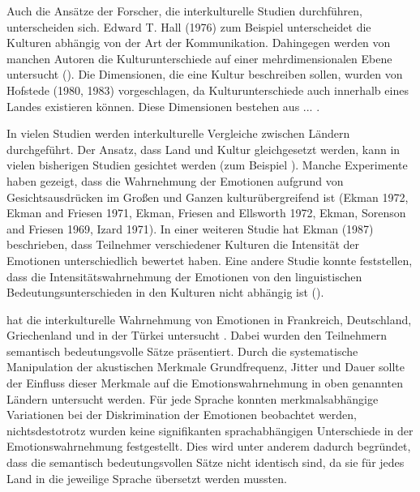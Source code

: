 \documentclass[11pt,a4paper,headsepline,twoside,toc=bibliography]{scrreprt}
\begin{document}
Auch die Ansätze der Forscher, die interkulturelle Studien durchführen, unterscheiden sich. Edward T. Hall (1976) zum Beispiel unterscheidet die Kulturen abhängig von der Art der Kommunikation. Dahingegen werden von manchen Autoren die Kulturunterschiede auf einer mehrdimensionalen Ebene untersucht (\cite{Matsumoto}). Die Dimensionen, die eine Kultur beschreiben sollen, wurden von Hofstede (1980, 1983) vorgeschlagen, da Kulturunterschiede auch innerhalb eines Landes existieren können. Diese Dimensionen bestehen aus ... . 


In vielen Studien werden interkulturelle Vergleiche zwischen Ländern durchgeführt. Der Ansatz, dass Land und Kultur gleichgesetzt werden, kann in vielen bisherigen Studien gesichtet werden (zum Beispiel \cite{ekman1973cross}). Manche Experimente haben gezeigt, dass die Wahrnehmung der Emotionen aufgrund von Gesichtsausdrücken im Großen und Ganzen kulturübergreifend ist (Ekman 1972, Ekman and Friesen 1971, Ekman, Friesen and Ellsworth 1972, Ekman, Sorenson and Friesen 1969, Izard 1971). In einer weiteren Studie hat Ekman (1987) beschrieben, dass Teilnehmer verschiedener Kulturen die Intensität der Emotionen unterschiedlich bewertet haben. Eine andere Studie konnte feststellen, dass die Intensitätswahrnehmung der Emotionen von den linguistischen Bedeutungsunterschieden in den Kulturen nicht abhängig ist (\cite{matsumoto1989american}). 


\citeauthor{Burkhardt2006} hat die interkulturelle Wahrnehmung von Emotionen  in Frankreich, Deutschland, Griechenland und in der Türkei untersucht \parencite{Burkhardt2006}. Dabei wurden den Teilnehmern semantisch bedeutungsvolle Sätze  präsentiert. Durch die systematische Manipulation der akustischen Merkmale Grundfrequenz, Jitter und Dauer sollte der Einfluss dieser Merkmale auf die Emotionswahrnehmung in oben genannten Ländern untersucht werden. Für jede Sprache konnten merkmalsabhängige Variationen bei der Diskrimination der Emotionen beobachtet werden, nichtsdestotrotz wurden keine signifikanten sprachabhängigen Unterschiede in der Emotionswahrnehmung festgestellt. Dies wird unter anderem dadurch begründet, dass die semantisch bedeutungsvollen Sätze nicht identisch sind, da sie für jedes Land in die jeweilige Sprache übersetzt werden mussten.
\end{document}
